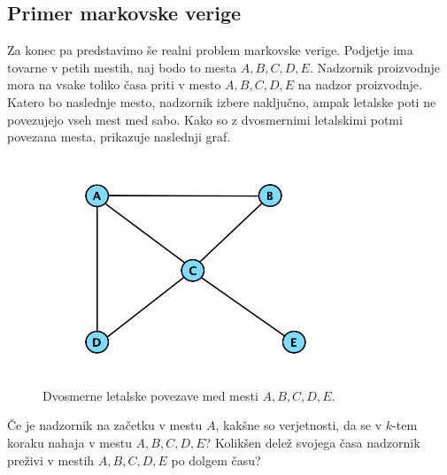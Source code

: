 \documentclass[mat1]{fmfdelo}
\begin{document}
\subsection{Primer markovske verige}
Za konec pa predstavimo še realni problem markovske verige. Podjetje ima tovarne v petih mestih, naj bodo to mesta $A, B, C, D, E$. Nadzornik proizvodnje mora na vsake toliko časa priti v mesto $A, B, C, D, E$ na nadzor proizvodnje. Katero bo naslednje mesto, nadzornik izbere naključno, ampak letalske poti ne povezujejo vseh mest med sabo. Kako so z dvosmernimi letalskimi potmi povezana mesta, prikazuje naslednji graf.
\begin{figure}[H]
    \centering
    \includegraphics[width=0.8\textwidth]{grafUndir.jpg}
    \caption{Dvosmerne letalske povezave med mesti $A,B,C,D,E$.}
\end{figure}
Če je nadzornik na začetku v mestu $A$, kakšne so verjetnosti, da se v $k$-tem koraku nahaja v mestu $A,B,C,D,E$? Kolikšen delež svojega časa nadzornik preživi v mestih $A,B,C,D,E$ po dolgem času?
\end{document}
